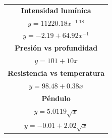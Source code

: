 \documentclass[letter,11pt]{article}
\begin{document}
\begin{center}
\begin{tabular}{|c|c|}
\hline
\multicolumn{2}{|c|}{\textbf{Intensidad lumínica}} \\
\multicolumn{2}{|c|}{$y = 11220.18 x^{-1.18}$} \\
\multicolumn{2}{|c|}{$y = -2.19 + 64.92 x^{-1}$} \\
\hline
\multicolumn{2}{|c|}{\textbf{Presión vs profundidad}} \\
\multicolumn{2}{|c|}{$y = 101 + 10 x$} \\
\hline
\multicolumn{2}{|c|}{\textbf{Resistencia vs temperatura}} \\
\multicolumn{2}{|c|}{$y = 98.48 + 0.38 x$} \\
\hline
\multicolumn{2}{|c|}{\textbf{Péndulo}} \\
\multicolumn{2}{|c|}{$y = 5.0119 \sqrt{x}$} \\
\multicolumn{2}{|c|}{$y = -0.01 + 2.02 \sqrt{x}$} \\
\hline
\end{tabular}
\end{center}
\end{document}

